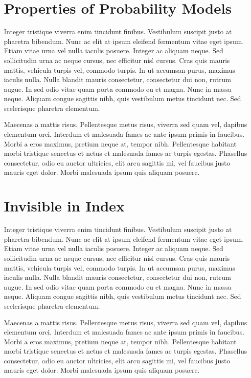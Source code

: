 \documentclass[11pt,letterpaper]{book}
\begin{document}
\section*{Properties of Probability Models}
\noindent  Integer tristique viverra enim tincidunt finibus. Vestibulum suscipit justo at pharetra bibendum. Nunc ac elit at ipsum eleifend fermentum vitae eget ipsum. Etiam vitae urna vel nulla iaculis posuere. Integer ac aliquam neque. Sed sollicitudin urna ac neque cursus, nec efficitur nisl cursus. Cras quis mauris mattis, vehicula turpis vel, commodo turpis. In ut accumsan purus, maximus iaculis nulla. Nulla blandit mauris consectetur, consectetur dui non, rutrum augue. In sed odio vitae quam porta commodo eu et magna. Nunc in massa neque. Aliquam congue sagittis nibh, quis vestibulum metus tincidunt nec. Sed scelerisque pharetra elementum.

Maecenas a mattis risus. Pellentesque metus risus, viverra sed quam vel, dapibus elementum orci. Interdum et malesuada fames ac ante ipsum primis in faucibus. Morbi a eros maximus, pretium neque at, tempor nibh. Pellentesque habitant morbi tristique senectus et netus et malesuada fames ac turpis egestas. Phasellus consectetur, odio eu auctor ultricies, elit arcu sagittis mi, vel faucibus justo mauris eget dolor. Morbi malesuada ipsum quis aliquam posuere. 

\section*{Invisible in Index}
\noindent  Integer tristique viverra enim tincidunt finibus. Vestibulum suscipit justo at pharetra bibendum. Nunc ac elit at ipsum eleifend fermentum vitae eget ipsum. Etiam vitae urna vel nulla iaculis posuere. Integer ac aliquam neque. Sed sollicitudin urna ac neque cursus, nec efficitur nisl cursus. Cras quis mauris mattis, vehicula turpis vel, commodo turpis. In ut accumsan purus, maximus iaculis nulla. Nulla blandit mauris consectetur, consectetur dui non, rutrum augue. In sed odio vitae quam porta commodo eu et magna. Nunc in massa neque. Aliquam congue sagittis nibh, quis vestibulum metus tincidunt nec. Sed scelerisque pharetra elementum.

Maecenas a mattis risus. Pellentesque metus risus, viverra sed quam vel, dapibus elementum orci. Interdum et malesuada fames ac ante ipsum primis in faucibus. Morbi a eros maximus, pretium neque at, tempor nibh. Pellentesque habitant morbi tristique senectus et netus et malesuada fames ac turpis egestas. Phasellus consectetur, odio eu auctor ultricies, elit arcu sagittis mi, vel faucibus justo mauris eget dolor. Morbi malesuada ipsum quis aliquam posuere. 
\end{document}
